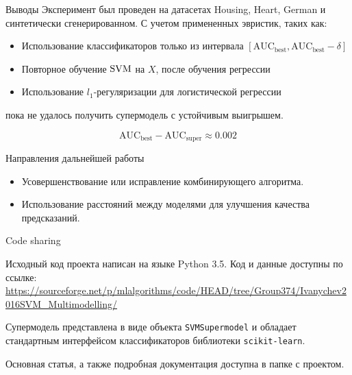 \documentclass{beamer}
\begin{document}
\begin{frame}{Выводы}
	Эксперимент был проведен на датасетах Housing, Heart, German и синтетически сгенерированном. С учетом примененных эвристик, таких как:
	\begin{itemize}
	\item 	Использование классификаторов только из интервала $[\mathrm{AUC_\text{best}}, \mathrm{AUC_\text{best}} - \delta]$
	\item Повторное обучение $\mathrm{SVM}$ на $X$, после обучения регрессии
	\item Использование $l_1$-регуляризации для логистической регрессии
	\end{itemize}
	пока не удалось получить супермодель с устойчивым выигрышем. 
	
	$$
	\mathrm{AUC}_{\text{best}} - 
	\mathrm{AUC}_{\text{super}} \approx 0.002
	$$
	\begin{block}{Направления дальнейшей работы}
		\begin{itemize}
			\item Усовершенствование или исправление комбинирующего алгоритма.
			\item Использование расстояний между моделями для улучшения качества предсказаний.
		\end{itemize}
	\end{block}

\end{frame}
\begin{frame}{Code sharing}

		Исходный код проекта написан на языке Python 3.5. Код и данные доступны по ссылке:
		{\tiny
		\href{https://sourceforge.net/p/mlalgorithms/code/HEAD/tree/Group374/Ivanychev2016SVM_Multimodelling/}{https://sourceforge.net/p/mlalgorithms/code/HEAD/tree/Group374/Ivanychev2016SVM\_Multimodelling/}	}
	
	Супермодель представлена в виде объекта \texttt{SVMSupermodel} и обладает стандартным интерфейсом классификаторов библиотеки \texttt{scikit-learn}. 
	
	Основная статья, а также подробная документация доступна в папке с проектом.
\end{frame}
\end{document}
